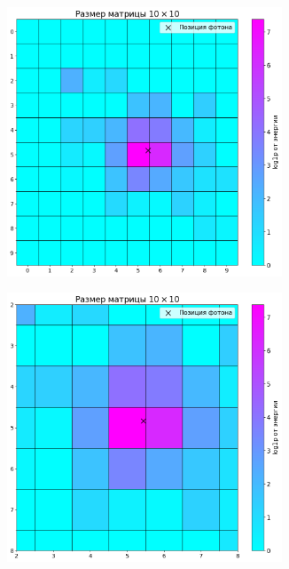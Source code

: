 \documentclass[a4paper,12pt]{extarticle}
\begin{document}
\begin{figure}[t]
    \centering
    \begin{subfigure}{0.5\textwidth}
        \centering
        \includegraphics[width=0.9\textwidth]{graphics/data_10x10.png}
    \end{subfigure}%
    \begin{subfigure}{0.5\textwidth}
        \centering
        \includegraphics[width=0.9\textwidth]{graphics/data_10x10_zoomed.png}
    \end{subfigure}


\end{figure}
\end{document}
